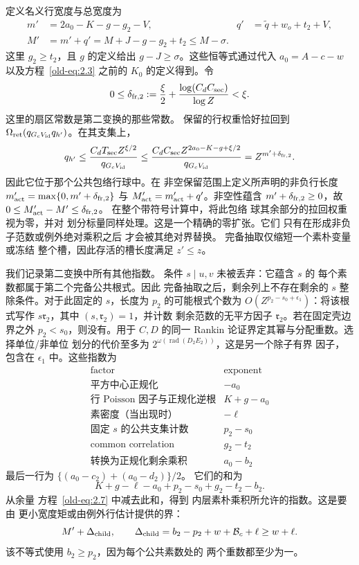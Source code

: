 定义名义行宽度与总宽度为
\begin{equation}
 \begin{aligned}
 m'&=2a_0-K-g-g_2-V,&
 q'&=\widetilde q+w_o+t_2+V,\\
 M'&=m'+q'
    =M+J-g-g_2+t_2
    \le M-\sigma.
 \end{aligned}
 \label{old-eq:2.13}
\end{equation}
这里 \(g_2\ge t_2\)，且 \(g\) 的定义给出
\(g-J\ge\sigma\)。这些恒等式通过代入
\(a_0=A-c-w\) 以及方程~\eqref{old-eq:2.3} 之前的
\(K_0\) 的定义得到。令
\[
 0\le\delta_{{\rm fr},2}:=\frac\xi2+
       \frac{\log(C_dC_{\rm sec})}{\log Z}<\xi.
\]
这里的扇区常数是第二变换的那些常数。
保留的行权重恰好拉回到
\(\Omega_{\rm ret}(q_{G_cV_{\rm id}}q_{h'})\)。在其支集上，
\[
 q_{h'}\le
 \frac{C_dT_{\rm sec}Z^{\xi/2}}{q_{G_cV_{\rm id}}}
 \le\frac{C_dC_{\rm sec}Z^{2a_0-K-g+\xi/2}}
          {q_{G_cV_{\rm id}}}
 =Z^{m'+\delta_{{\rm fr},2}}.
\]
因此它位于那个公共包络行球中。在
非空保留范围上定义所声明的非负行长度
\(m'_{\rm act}=\max\{0,m'+\delta_{{\rm fr},2}\}\) 与
\(M'_{\rm act}=m'_{\rm act}+q'\)。非空性蕴含
\(m'+\delta_{{\rm fr},2}\ge0\)，故
\(0\le M'_{\rm act}-M'\le\delta_{{\rm fr},2}\)。
在整个带符号计算中，将此包络
球其余部分的拉回权重视为零，并对
划分标量同样处理。这是一个精确的零扩张。它们
只有在形成非负子范数或例外绝对乘积之后
才会被其绝对界替换。
完备抽取仅缩短一个素朴变量或冻结
整个槽，因此存活的槽长度满足 \(z'\le z\)。

我们记录第二变换中所有其他指数。
条件 \(s\mid u,v\) 未被丢弃：它蕴含 \(s\) 的
每个素数都属于第二个完备公共根式。因此
完备抽取之后，剩余列上不存在剩余的
\(s\) 整除条件。对于此固定的
\(s\)，长度为 \(p_2\) 的可能根式个数为 \(O(Z^{p_2-s_0+\epsilon_1})\)：将该根式写作
\(s\mathfrak r_2\)，其中 \((s,\mathfrak r_2)=1\)，并计数
剩余范数的无平方因子 \(\mathfrak r_2\)。若在固定壳边界之外
\(p_2<s_0\)，则没有。用于 \(C,D\) 的同一 Rankin
论证界定其幂与分配重数。选择单位/非单位
划分的代价至多为
\(2^{\omega(\operatorname{rad}(D_2E_2))}\)，这是另一个除子有界
因子，包含在 \(\epsilon_1\) 中。这些指数为
\[
 \begin{array}{l|r}
 \text{factor}&\text{exponent}\\ \hline
 \text{平方中心正规化}&-a_0\\
 \text{行 Poisson 因子与正规化逆根}&K+g-a_0\\
 \text{素密度（当出现时）}&-\ell\\
 \text{固定 }s\text{ 的公共支集计数}&p_2-s_0\\
 \text{common correlation}&g_2-t_2\\
 \text{转换为正规化剩余乘积}&a_0-b_2
 \end{array}
\]
最后一行为
\(\{(a_0-c_2)+(a_0-d_2)\}/2\)。
它们的和为
\[
 K+g-\ell-a_0+p_2-s_0+g_2-t_2-b_2.
\]
从余量
方程~\eqref{old-eq:2.7} 中减去此和，得到
内层素朴乘积所允许的指数。这是要由
更小宽度矩或由例外行估计提供的界：
\begin{equation}
 M'+\Delta_{\rm child},\qquad
 \Delta_{\rm child}=b_2-p_2+w+\mathcal B_c+\ell
                   \ge w+\ell.
 \label{old-eq:2.14}
\end{equation}
该不等式使用 \(b_2\ge p_2\)，因为每个公共素数处的
两个重数都至少为一。

